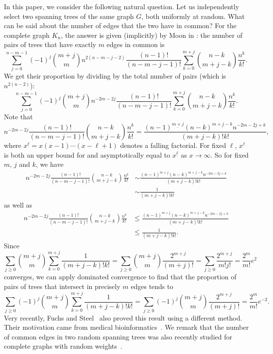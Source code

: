 \documentclass[a4paper,12pt,reqno]{amsart}
\theoremstyle{remark}
\begin{document}
In this paper, we consider the following natural question. Let us independently select two spanning trees of the same graph $G$, both uniformly at random. What can be said about the number of edges that the two have in common? For the complete graph $K_n$, the answer is given (implicitly) by Moon in \cite{moon2}: the number of pairs of trees that have exactly $m$ edges in common is
\[\sum_{j=0}^{n-m-1} (-1)^j \binom{m+j}{m} n^{2(n-m-j-2)} \frac{(n-1)!}{(n-m-j-1)!} \sum_{k=0}^{m+j} \binom{n-k}{m+j-k} \frac{n^k}{k!}.\]
We get their proportion by dividing by the total number of pairs (which is $n^{2(n-2)}$):
\[\sum_{j=0}^{n-m-1} (-1)^j \binom{m+j}{m} n^{-2m-2j} \frac{(n-1)!}{(n-m-j-1)!} \sum_{k=0}^{m+j} \binom{n-k}{m+j-k} \frac{n^k}{k!}.\]
Note that
\[n^{-2m-2j} \frac{(n-1)!}{(n-m-j-1)!} \binom{n-k}{m+j-k} \frac{n^k}{k!} 
= \frac{(n-1)^{\underline{m+j}}(n-k)^{\underline{m+j-k}}n^{-2m-2j+k}}{(m+j-k)!k!},\]
where $x^{\underline{\ell}} = x(x-1)\cdots (x-\ell+1)$ denotes a falling factorial. For fixed $\ell$, $x^{\ell}$ is both an upper bound for and asymptotically equal to $x^{\underline{\ell}}$ as $x \to \infty$. So for fixed $m$, $j$ and $k$, we have
\begin{align*}n^{-2m-2j} \frac{(n-1)!}{(n-m-j-1)!} \binom{n-k}{m+j-k} \frac{n^k}{k!} &\sim 
\frac{(n-1)^{m+j}(n-k)^{m+j-k}n^{-2m-2j+k}}{(m+j-k)!k!} \\
&\sim \frac{1}{(m+j-k)!k!}
\end{align*}
as well as
\begin{align}n^{-2m-2j} \frac{(n-1)!}{(n-m-j-1)!} \binom{n-k}{m+j-k} \frac{n^k}{k!} &\leq
\frac{(n-1)^{m+j}(n-k)^{m+j-k}n^{-2m-2j+k}}{(m+j-k)!k!} \nonumber \\
&\leq \frac{1}{(m+j-k)!k!}.\label{eq:aux-upper-bound}
\end{align}
Since
\begin{equation}\label{eq:bound}
 \sum_{j \geq 0} \binom{m+j}{m} \sum_{k=0}^{m+j} \frac{1}{(m+j-k)!k!} = \sum_{j \geq 0} \binom{m+j}{m} \frac{2^{m+j}}{(m+j)!} = \sum_{j \geq 0} \frac{2^{m+j}}{m!j!} = \frac{2^m}{m!} e^2
\end{equation}
converges, we can apply dominated convergence to find that the proportion of pairs of trees that intersect in precisely $m$ edges tends to
\begin{equation}\label{eq:limit}
 \sum_{j \geq 0} (-1)^j \binom{m+j}{m} \sum_{k=0}^{m+j} \frac{1}{(m+j-k)!k!} = \sum_{j \geq 0} (-1)^j \binom{m+j}{m} \frac{2^{m+j}}{(m+j)!} = \frac{2^m}{m!} e^{-2}.
\end{equation}
Very recently, Fuchs and Steel~\cite{fuchs} also proved this result  using a different method. Their
motivation came from medical bioinformatics~\cite{khayatian}. We remark that the number of common edges in two random spanning trees was also recently studied for complete graphs with random weights~\cite{makowiec}.
\end{document}
